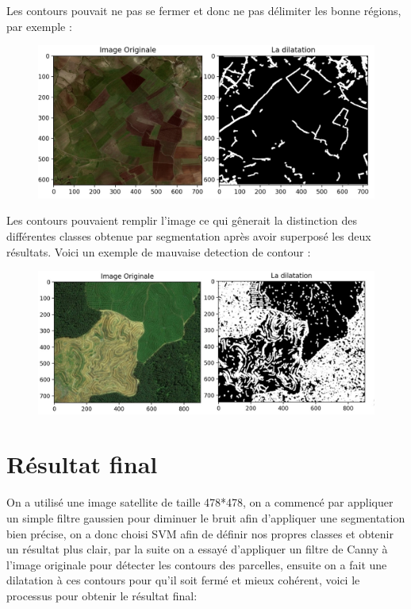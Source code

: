 \documentclass[12pt, openany]{report}
\begin{document}
\begin{mylist}
\item Les contours pouvait ne pas se fermer et donc ne pas délimiter les bonne régions, par exemple : 
    \begin{figure}[H]
    \centering
    \includegraphics[scale=0.47]{contour_ouvert.jpg}
    \end{figure}
\item Les contours pouvaient remplir l'image ce qui gênerait la distinction des différentes classes obtenue par segmentation après avoir superposé les deux résultats. Voici un exemple de mauvaise detection de contour : 

    \begin{figure}[H]
    \centering
    \includegraphics[scale=0.47]{contour_grand.jpg}
    \end{figure}


\end{mylist}

\section{Résultat final}

On a utilisé une image satellite de taille 478*478, on a commencé par appliquer un simple filtre gaussien pour diminuer le bruit afin d'appliquer une segmentation bien précise, on a donc choisi SVM afin de définir nos propres classes et obtenir un résultat plus clair, par la suite on a essayé d'appliquer un filtre de Canny à l'image originale pour détecter les contours des parcelles, ensuite on a fait une dilatation à ces contours pour qu'il soit fermé et mieux cohérent, voici le processus pour obtenir le résultat final: 
\end{document}
